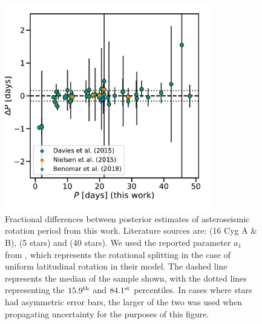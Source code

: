 \begin{figure}[h!]
 \centering
 \includegraphics[width=0.8\textwidth]{Images/seis_comparison_rot_alt2.pdf}
 \caption{Fractional differences between posterior estimates of asteroseismic rotation period from this work. Literature sources are: \cite{davies+2015} (16 Cyg A \& B), \cite{nielsen+2015} (5 stars) and \cite{benomar+2018} (40 stars). We used the reported parameter $a_{1}$ from \cite{benomar+2018}, which represents the rotational splitting in the case of uniform latitudinal rotation in their model. The dashed line represents the median of the sample shown, with the dotted lines representing the $15.9^{\rm{th}}$ and $84.1^{\rm{st}}$ percentiles. In cases where stars had asymmetric error bars, the larger of the two was used when propagating uncertainty for the purposes of this figure.}
 \label{fig:literaturecomp}
\end{figure}

